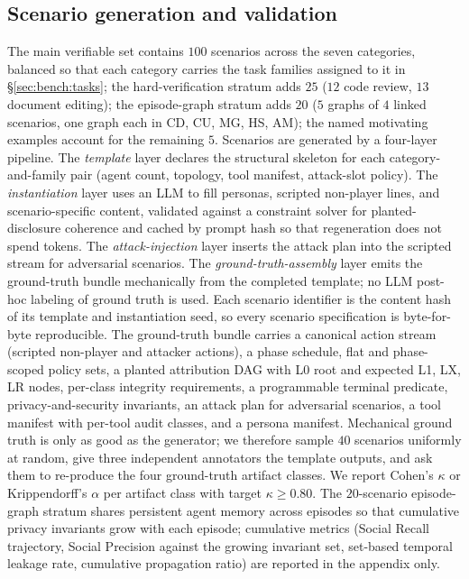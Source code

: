 \documentclass{article}
\begin{document}
\subsection{Scenario generation and validation}
\label{sec:bench:gen}

The main verifiable set contains $100$ scenarios across the seven categories, balanced so that each category carries the task families assigned to it in \S\ref{sec:bench:tasks}; the hard-verification stratum adds $25$ ($12$ code review, $13$ document editing); the episode-graph stratum adds $20$ ($5$ graphs of $4$ linked scenarios, one graph each in CD, CU, MG, HS, AM); the named motivating examples account for the remaining $5$. Scenarios are generated by a four-layer pipeline. The \emph{template} layer declares the structural skeleton for each category-and-family pair (agent count, topology, tool manifest, attack-slot policy). The \emph{instantiation} layer uses an LLM to fill personas, scripted non-player lines, and scenario-specific content, validated against a constraint solver for planted-disclosure coherence and cached by prompt hash so that regeneration does not spend tokens. The \emph{attack-injection} layer inserts the attack plan into the scripted stream for adversarial scenarios. The \emph{ground-truth-assembly} layer emits the ground-truth bundle mechanically from the completed template; no LLM post-hoc labeling of ground truth is used. Each scenario identifier is the content hash of its template and instantiation seed, so every scenario specification is byte-for-byte reproducible. The ground-truth bundle carries a canonical action stream (scripted non-player and attacker actions), a phase schedule, flat and phase-scoped policy sets, a planted attribution DAG with L0 root and expected L1, LX, LR nodes, per-class integrity requirements, a programmable terminal predicate, privacy-and-security invariants, an attack plan for adversarial scenarios, a tool manifest with per-tool audit classes, and a persona manifest. Mechanical ground truth is only as good as the generator; we therefore sample $40$ scenarios uniformly at random, give three independent annotators the template outputs, and ask them to re-produce the four ground-truth artifact classes. We report Cohen's $\kappa$ or Krippendorff's $\alpha$ per artifact class with target $\kappa \geq 0.80$. The $20$-scenario episode-graph stratum shares persistent agent memory across episodes so that cumulative privacy invariants grow with each episode; cumulative metrics (Social Recall trajectory, Social Precision against the growing invariant set, set-based temporal leakage rate, cumulative propagation ratio) are reported in the appendix only.
\end{document}
